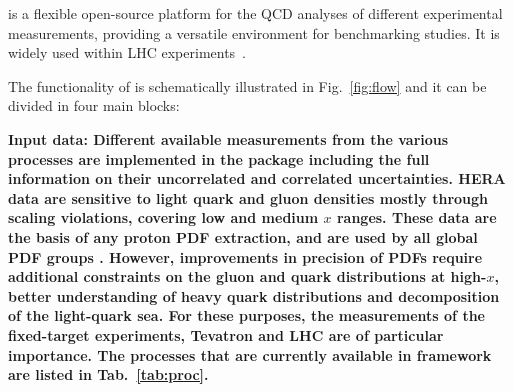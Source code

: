 %
\label{sec:structure}

\fitter is a flexible open-source platform for the QCD analyses of different experimental measurements, 
providing a versatile environment for benchmarking studies. It is widely used within 
LHC experiments~\cite{atlas:strange,atlas:jets,atlas:hm,cms:strange,cms:jets,h1:2012kk,h1zeus:charm}.  

The functionality of \fitter is schematically illustrated in Fig.~\ref{fig:flow} and it can be divided in four main blocks: %

\begin{description}
\item 
\bf {Input data:} \rm Different available measurements from the various processes
are implemented in the \fitter package including the full information on their uncorrelated 
and correlated uncertainties. HERA data 
are sensitive to light quark and gluon densities mostly through scaling violations, 
covering low and medium $x$ ranges. These data are the basis of any proton PDF extraction,
and are used by all global PDF groups \cite{MSTWpdf, CT10pdf, NNPDFpdf, ABMpdf, JRpdf}. 
However, improvements in precision of PDFs require additional constraints on the gluon and 
quark distributions at high-$x$, better understanding of heavy quark distributions and 
decomposition of the light-quark sea.  For these purposes, the measurements of the fixed-target 
experiments, Tevatron and LHC are of particular importance.
%
%
The processes that are currently available in \fitter framework are listed in Tab.~\ref{tab:proc}.

%
\begin{table}
\small
\scriptsize


\end{table}
\end{description}
